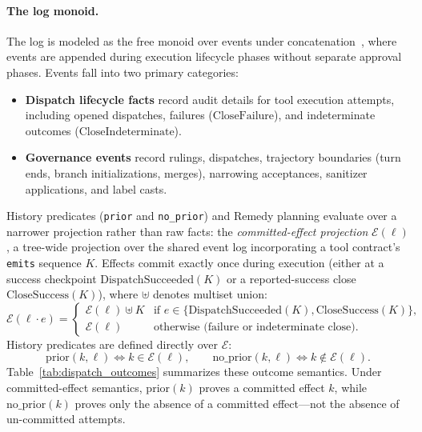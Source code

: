 \paragraph{The log monoid.}
The log is modeled as the free monoid over events under concatenation~\cite{pierce2002types}, where events are appended during execution lifecycle phases without separate approval phases. Events fall into two primary categories:
\begin{itemize}
  \item \textbf{Dispatch lifecycle facts} record audit details for tool execution attempts, including opened dispatches, failures ($\mathrm{CloseFailure}$), and indeterminate outcomes ($\mathrm{CloseIndeterminate}$).
  \item \textbf{Governance events} record rulings, dispatches, trajectory boundaries (turn ends, branch initializations, merges), narrowing acceptances, sanitizer applications, and label casts.
\end{itemize}

History predicates (\texttt{prior} and \texttt{no\_prior}) and Remedy planning evaluate over a narrower projection rather than raw facts: the \emph{committed-effect projection} $\mathcal{E}(\ell)$, a tree-wide projection over the shared event log incorporating a tool contract's \texttt{emits} sequence $K$. Effects commit exactly once during execution (either at a success checkpoint $\mathrm{DispatchSucceeded}(K)$ or a reported-success close $\mathrm{CloseSuccess}(K)$), where $\uplus$ denotes multiset union:
{\small
\[
  \mathcal{E}(\ell \cdot e) = \begin{cases}
    \mathcal{E}(\ell) \uplus K & \text{if } e \in \{\mathrm{DispatchSucceeded}(K), \mathrm{CloseSuccess}(K)\}, \\
    \mathcal{E}(\ell) & \text{otherwise (failure or indeterminate close).}
  \end{cases}
\]}
History predicates are defined directly over $\mathcal{E}$:
\[
  \mathrm{prior}(k, \ell) \iff k \in \mathcal{E}(\ell), \qquad \mathrm{no\_prior}(k, \ell) \iff k \notin \mathcal{E}(\ell).
\]
Table~\ref{tab:dispatch_outcomes} summarizes these outcome semantics. Under committed-effect semantics, $\mathrm{prior}(k)$ proves a committed effect $k$, while $\mathrm{no\_prior}(k)$ proves only the absence of a committed effect—not the absence of un-committed attempts.

